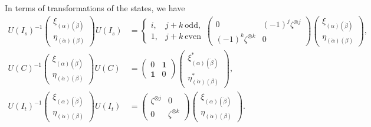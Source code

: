 In terms of transformations of the states, we have
\begin{equation}
\begin{aligned}
  U(I_s)^{-1}
  \begin{pmatrix}
    \xi_{(\alpha)(\dot\beta)}\\
    \eta_{(\dot\alpha)(\beta)}
  \end{pmatrix}
  U(I_s)
  &=
  \begin{cases}
    i,&j+k\ \text{odd},\\
    1,&j+k\ \text{even}
  \end{cases}
  \begin{pmatrix}
    0&(-1)^j\zeta^{\otimes j}\\
    (-1)^k\zeta^{\otimes k}&0
  \end{pmatrix}
  \begin{pmatrix}
    \xi_{(\alpha)(\dot\beta)}\\
    \eta_{(\dot\alpha)(\beta)}
  \end{pmatrix},\\[6pt]
  U(C)^{-1}
  \begin{pmatrix}
    \xi_{(\alpha)(\dot\beta)}\\
    \eta_{(\dot\alpha)(\beta)}
  \end{pmatrix}
  U(C)
  &=
  \begin{pmatrix}0&\mathbf{1}\\\mathbf{1}&0\end{pmatrix}
  \begin{pmatrix}
    \xi_{(\alpha)(\dot\beta)}^*\\
    \eta_{(\dot\alpha)(\beta)}^*
  \end{pmatrix},\\[6pt]
  U(I_t)^{-1}
  \begin{pmatrix}
    \xi_{(\alpha)(\dot\beta)}\\
    \eta_{(\dot\alpha)(\beta)}
  \end{pmatrix}
  U(I_t)
  &=
  \begin{pmatrix}
    \zeta^{\otimes j}&0\\
    0&\zeta^{\otimes k}
  \end{pmatrix}
  \begin{pmatrix}
    \xi_{(\alpha)(\dot\beta)}\\
    \eta_{(\dot\alpha)(\beta)}
  \end{pmatrix} .
\end{aligned}
\tag{1-52}\label{eq:ch1-general-spinor-state-rules}
\end{equation}
